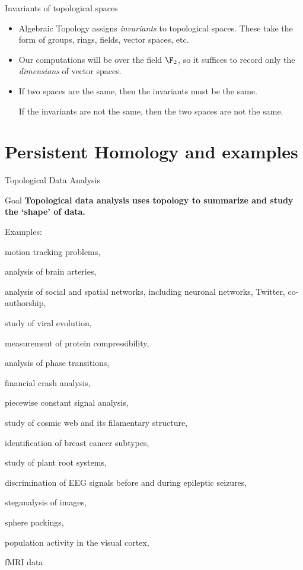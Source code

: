 \documentclass[usenames,dvipsnames,aspectratio=1610]{beamer}
\begin{document}
\begin{frame}{Invariants of topological spaces}
  \begin{itemize}
    \item Algebraic Topology assigns {\em invariants} to topological spaces.
      These take the form of groups, rings, fields, vector spaces, etc.
    \item Our computations will be over the field $\F_2$, so it suffices to record
      only the {\em dimensions} of vector spaces. 
    \item If two spaces are the same, then the invariants must be the same. 
      
      If the invariants are not the same, then the two spaces are not the same.
  \end{itemize}
\end{frame}

\section{Persistent Homology and examples}
\begin{frame}{Topological Data Analysis}
  \begin{alertblock}{Goal}
    {\bf Topological data analysis uses topology to summarize and study the
    `shape' of data.}
  \end{alertblock}
  \vspace{-0.1in}
  \pause
  Examples:
  \vspace{-0.1in}
  \begin{itemize}
  \begin{multicols}{2}
  \item motion tracking problems,
  \item analysis of brain arteries,
  \item analysis of social and spatial networks, including neuronal
    networks, Twitter, co-authorship,
  \item study of viral evolution,
  \item measurement of protein compressibility,
  \item analysis of phase transitions,
  \item financial crash analysis,
  \item piecewise constant signal analysis,
  \item study of cosmic web and its filamentary structure,
  \item identification of breast cancer subtypes,
  \item study of plant root systems,
  \item discrimination of EEG signals before and during epileptic seizures,
  \item steganalysis of images,
  \item sphere packings,
  \item population activity in the visual cortex,
  \item fMRI data
  \end{multicols}

  \end{itemize}
\end{frame}
\end{document}

